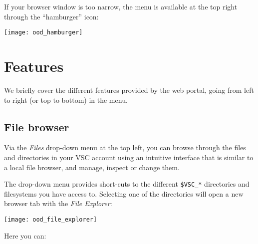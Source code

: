 If your browser window is too narrow, the menu is available at the top right through the ``hamburger'' icon:

\begin{center}
    \texttt{[image: ood\_hamburger]}
\end{center}


\section{Features}

We briefly cover the different features provided by the web portal, going from left to right (or top to bottom) in the menu.

\subsection{File browser}

Via the \emph{Files} drop-down menu at the top left, you can browse through the files and directories in your
VSC account using an intuitive interface that is similar to a local file browser, and manage, inspect or change them.

The drop-down menu provides
short-cuts to the different \lstinline|$VSC_*| directories and filesystems you have access to.
Selecting one of the directories will open a new browser tab with the \emph{File Explorer}:

\begin{center}
    \texttt{[image: ood\_file\_explorer]}
\end{center}

Here you can:

